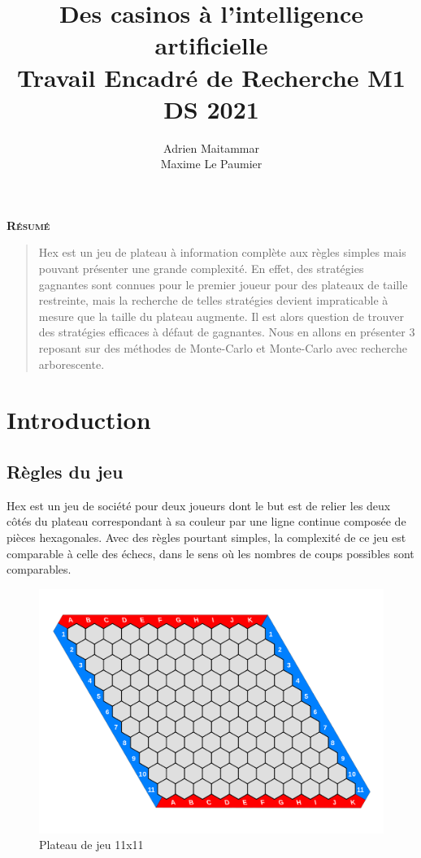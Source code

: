 \documentclass[a4paper]{article}
\title{\huge Des casinos à l'intelligence artificielle\\[15pt] \small Travail Encadré de Recherche M1 DS 2021}
\author{Adrien Maitammar \\ Maxime Le Paumier}
\theoremstyle{definition}
\renewenvironment{abstract}
{
	\centerline
	{\large \bfseries \scshape Résumé}
	\begin{quote}
	}
	{
	\end{quote}
}
\begin{document}
\maketitle

\vspace{40pt}

\begin{abstract}
Hex est un jeu de plateau à information complète aux règles simples mais pouvant présenter une grande complexité. En effet, des stratégies gagnantes sont connues pour le premier joueur pour des plateaux de taille restreinte, mais la recherche de telles stratégies devient impraticable à mesure que la taille du plateau augmente. Il est alors question de trouver des stratégies efficaces à défaut de gagnantes. Nous en allons en présenter 3 reposant sur des méthodes de Monte-Carlo et Monte-Carlo avec recherche arborescente. 
\end{abstract}
\newpage

\renewcommand{\contentsname}{Sommaire}
\tableofcontents
 \clearpage
 
 
\section{Introduction}

\subsection{Règles du jeu}

Hex est un jeu de société pour deux joueurs dont le but est de relier les deux côtés du plateau correspondant à sa couleur par une ligne continue composée de pièces hexagonales. Avec des règles pourtant simples, la complexité de ce jeu est comparable à celle des échecs, dans le sens où les nombres de coups possibles sont comparables. 

\begin{figure}[h]
	\centering
	\includegraphics[scale=0.13]{11x11.png}
	\caption{Plateau de jeu 11x11}
\end{figure}
\end{document}
